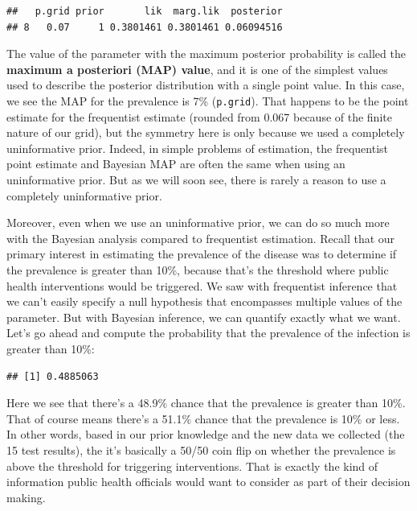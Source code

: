 \documentclass[
]{book}
\newenvironment{Shaded}{\begin{snugshade}}{\end{snugshade}}
\newcommand{\FloatTok}[1]{\textcolor[rgb]{0.00,0.00,0.81}{#1}}
\newcommand{\FunctionTok}[1]{\textcolor[rgb]{0.13,0.29,0.53}{\textbf{#1}}}
\newcommand{\NormalTok}[1]{#1}
\newcommand{\SpecialCharTok}[1]{\textcolor[rgb]{0.81,0.36,0.00}{\textbf{#1}}}
\begin{document}
\begin{verbatim}
##   p.grid prior       lik  marg.lik  posterior
## 8   0.07     1 0.3801461 0.3801461 0.06094516
\end{verbatim}

The value of the parameter with the maximum posterior probability is
called the \textbf{maximum a posteriori (MAP) value}, and it is one of the
simplest values used to describe the posterior distribution with a
single point value. In this case, we see the MAP for the prevalence is
7\% (\texttt{p.grid}). That happens to be the point estimate for the frequentist
estimate (rounded from 0.067 because of the finite nature of our grid),
but the symmetry here is only because we used a completely uninformative
prior. Indeed, in simple problems of estimation, the frequentist point
estimate and Bayesian MAP are often the same when using an uninformative
prior. But as we will soon see, there is rarely a reason to use a
completely uninformative prior.

Moreover, even when we use an uninformative prior, we can do so much
more with the Bayesian analysis compared to frequentist estimation.
Recall that our primary interest in estimating the prevalence of the
disease was to determine if the prevalence is greater than 10\%, because
that's the threshold where public health interventions would be
triggered. We saw with frequentist inference that we can't easily
specify a null hypothesis that encompasses multiple values of the
parameter. But with Bayesian inference, we can quantify exactly what we
want. Let's go ahead and compute the probability that the prevalence of
the infection is greater than 10\%:

\begin{Shaded}
\end{Shaded}

\begin{verbatim}
## [1] 0.4885063
\end{verbatim}

Here we see that there's a 48.9\% chance that the prevalence is greater
than 10\%. That of course means there's a 51.1\% chance that the
prevalence is 10\% or less. In other words, based in our prior knowledge
and the new data we collected (the 15 test results), the it's basically
a 50/50 coin flip on whether the prevalence is above the threshold for
triggering interventions. That is exactly the kind of information public
health officials would want to consider as part of their decision
making.
\end{document}
